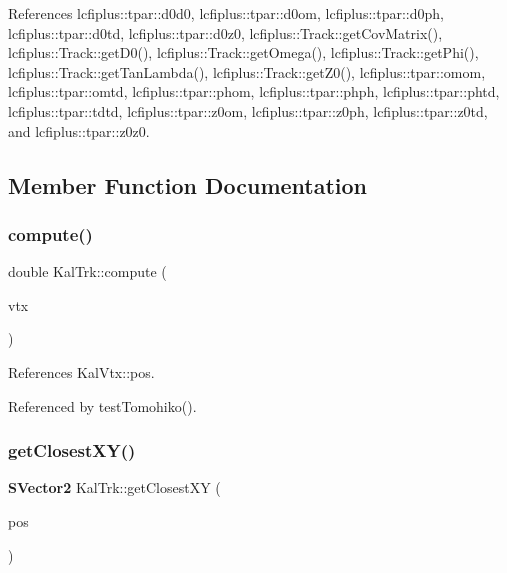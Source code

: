References lcfiplus\+::tpar\+::d0d0, lcfiplus\+::tpar\+::d0om, lcfiplus\+::tpar\+::d0ph, lcfiplus\+::tpar\+::d0td, lcfiplus\+::tpar\+::d0z0, lcfiplus\+::\+Track\+::get\+Cov\+Matrix(), lcfiplus\+::\+Track\+::get\+D0(), lcfiplus\+::\+Track\+::get\+Omega(), lcfiplus\+::\+Track\+::get\+Phi(), lcfiplus\+::\+Track\+::get\+Tan\+Lambda(), lcfiplus\+::\+Track\+::get\+Z0(), lcfiplus\+::tpar\+::omom, lcfiplus\+::tpar\+::omtd, lcfiplus\+::tpar\+::phom, lcfiplus\+::tpar\+::phph, lcfiplus\+::tpar\+::phtd, lcfiplus\+::tpar\+::tdtd, lcfiplus\+::tpar\+::z0om, lcfiplus\+::tpar\+::z0ph, lcfiplus\+::tpar\+::z0td, and lcfiplus\+::tpar\+::z0z0.



\subsection{Member Function Documentation}
\mbox{\label{structKalTrk_a9712c5fe64adebf1c5dcc14537960e78}} 
\subsubsection{compute()}
{\footnotesize\ttfamily double Kal\+Trk\+::compute (\begin{DoxyParamCaption}\item[{const \textbf{ Kal\+Vtx} \&}]{vtx }\end{DoxyParamCaption})\hspace{0.3cm}{\ttfamily [inline]}}



References Kal\+Vtx\+::pos.



Referenced by test\+Tomohiko().

\mbox{\label{structKalTrk_a151b6d6759ce0e8fa13cdc618dea815f}} 
\subsubsection{get\+Closest\+X\+Y()}
{\footnotesize\ttfamily \textbf{ S\+Vector2} Kal\+Trk\+::get\+Closest\+XY (\begin{DoxyParamCaption}\item[{\textbf{ S\+Vector3}}]{pos }\end{DoxyParamCaption})\hspace{0.3cm}{\ttfamily [inline]}}



